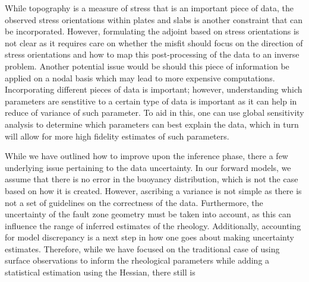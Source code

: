 \documentclass[a4paper]{article}
\begin{document}
While topography is a measure of stress that is an important piece of data, the observed stress orientations within plates and slabs is another constraint that can be incorporated. However, formulating the adjoint based on stress orientations is not clear as it requires care on whether the misfit should focus on the direction of stress orientations and how to map this post-processing of the data to an inverse problem. Another potential issue would be should this piece of information be applied on a nodal basis which may lead to more expensive computations. Incorporating different pieces of data is important; however, understanding which parameters are senstitive to a certain type of data is important as it can help in reduce of variance of such parameter. To aid in this, one can use global sensitivity analysis to determine which parameters can best explain the data, which in turn will allow for more high fidelity estimates of such parameters.

While we have outlined how to improve upon the inference phase, there a few underlying issue pertaining to the data uncertainty. In our forward models, we assume that there is no error in the buoyancy distribution, which is not the case based on how it is created. However, ascribing a variance is not simple as there is not a set of guidelines on the correctness of the data. Furthermore, the uncertainty of the fault zone geometry must be taken into account, as this can influence the range of inferred estimates of the rheology. Additionally, accounting for model discrepancy is a next step in how one goes about making uncertainty estimates. Therefore, while we have focused on the traditional case of using surface observations to inform the rheological parameters while adding a statistical estimation using the Hessian, there still is 
\end{document}
